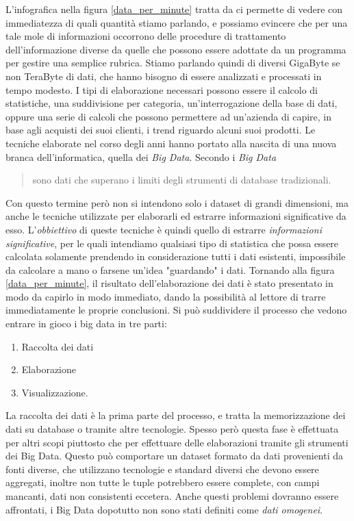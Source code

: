 L'infografica nella figura \ref{data_per_minute} tratta da \cite{data_per_minute} ci permette di vedere con immediatezza di quali quantità stiamo parlando, e possiamo evincere che per una tale mole di informazioni occorrono delle procedure di trattamento dell'informazione diverse da quelle che possono essere adottate da un programma per gestire una semplice rubrica. Stiamo parlando quindi di diversi GigaByte se non TeraByte di dati, che hanno bisogno di essere analizzati e processati in tempo modesto. I tipi di elaborazione necessari possono essere il calcolo di statistiche, una suddivisione per categoria, un'interrogazione della base di dati, oppure una serie di calcoli che possono permettere ad un'azienda di capire, in base agli acquisti dei suoi clienti, i trend riguardo alcuni suoi prodotti. Le tecniche elaborate nel corso degli anni hanno portato alla nascita di una nuova branca dell'informatica, quella dei \emph{Big Data}. Secondo \cite{rezzani2013big} i \emph{Big Data}
\begin{quotation}
sono dati che superano i limiti degli strumenti di database tradizionali.
\end{quotation}
Con questo termine però non si intendono solo i dataset di grandi dimensioni, ma anche le tecniche utilizzate per elaborarli ed estrarre informazioni significative da esso. L'\emph{obbiettivo} di queste tecniche è quindi quello di estrarre \emph{informazioni significative}, per le quali intendiamo qualsiasi tipo di statistica che possa essere calcolata solamente prendendo in considerazione tutti i dati esistenti, impossibile da calcolare a mano o farsene un'idea "guardando" i dati. Tornando alla figura \ref{data_per_minute}, il risultato dell'elaborazione dei dati è stato presentato in modo da capirlo in modo immediato, dando la possibilità al lettore di trarre immediatamente le proprie conclusioni.
Si può suddividere il processo che vedono entrare in gioco i big data in tre parti:
\begin{enumerate}
\item Raccolta dei dati
\item Elaborazione
\item Visualizzazione.
\end{enumerate}
La raccolta dei dati è la prima parte del processo, e tratta la memorizzazione dei dati su database o tramite altre tecnologie. Spesso però questa fase è effettuata per altri scopi piuttosto che per effettuare delle elaborazioni tramite gli strumenti dei Big Data. Questo può comportare un dataset formato da dati provenienti da fonti diverse, che utilizzano tecnologie e standard diversi che devono essere aggregati, inoltre non tutte le tuple potrebbero essere complete, con campi mancanti, dati non consistenti eccetera. Anche questi problemi dovranno essere affrontati, i Big Data dopotutto non sono stati definiti come \emph{dati omogenei}.

